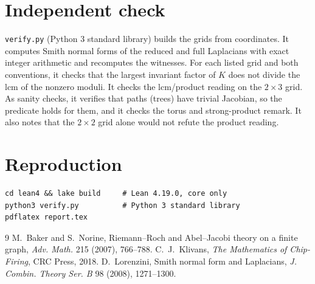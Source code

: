 \documentclass[11pt]{article}
\theoremstyle{definition}
\theoremstyle{remark}
\begin{document}
\section{Independent check}
\texttt{verify.py} (Python 3 standard library) builds the grids from
coordinates. It computes Smith normal forms of the reduced and full Laplacians
with exact integer arithmetic and recomputes the witnesses. For each listed grid and both
conventions, it checks that the largest invariant factor of $K$ does not
divide the lcm of the nonzero moduli. It checks the lcm/product reading on the $2\times3$ grid. As sanity checks, it
verifies that paths (trees) have trivial Jacobian, so the predicate holds for
them, and it checks the torus and strong-product remark. It also notes that the
$2\times2$ grid alone would not refute the product reading.

\section{Reproduction}
\begin{verbatim}
cd lean4 && lake build     # Lean 4.19.0, core only
python3 verify.py          # Python 3 standard library
pdflatex report.tex
\end{verbatim}

\begin{thebibliography}{9}
 M.~Baker and S.~Norine, Riemann--Roch and Abel--Jacobi theory on a
finite graph, \emph{Adv. Math.} 215 (2007), 766--788.
 C.~J.~Klivans, \emph{The Mathematics of Chip-Firing}, CRC Press, 2018.
 D.~Lorenzini, Smith normal form and Laplacians, \emph{J. Combin.
Theory Ser. B} 98 (2008), 1271--1300.
\end{thebibliography}
\end{document}
